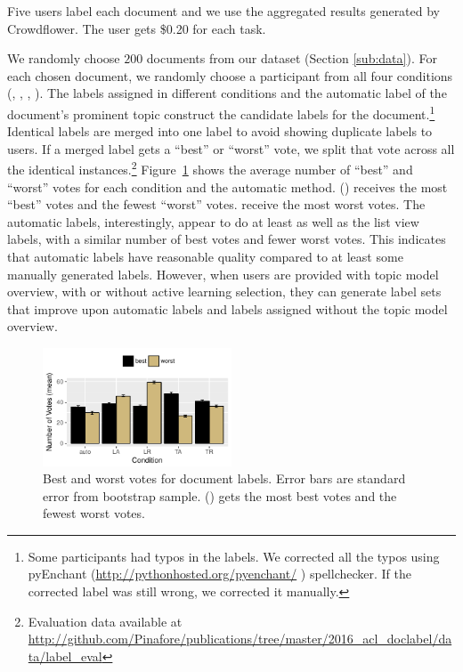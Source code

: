Five users label each document and we use the aggregated results generated by
Crowdflower. The user gets \$0.20 for each task. 

We randomly choose $200$ documents from our dataset (Section
\ref{sub:data}). For each chosen document, we randomly choose a participant from
all four conditions (, , , ). The labels
assigned in different conditions and the automatic label of the document's prominent
topic construct the candidate labels for the document.\footnote{Some
  participants had typos in the labels. We corrected all the typos using
  pyEnchant (\let\hyper@linkurl\saved@hyper@linkurl \url{http://pythonhosted.org/pyenchant/} \NoHyper) spellchecker. If the
  corrected label was still wrong, we corrected it manually.} Identical labels are
merged into one label to avoid showing duplicate labels to users. If a merged
label gets a ``best'' or ``worst'' vote, we split that vote across all the
identical instances.\footnote{
Evaluation data available at \let\hyper@linkurl\saved@hyper@linkurl\url{http://github.com/Pinafore/publications/tree/master/2016_acl_doclabel/data/label_eval} \NoHyper
}
Figure~\ref{fig:eval_votes} shows the average number of ``best'' and ``worst''
votes for each condition and the automatic method.
\name{} () receives the most ``best'' votes and the fewest
``worst'' votes.  receive the most worst votes. The automatic labels, interestingly, appear to do at least as well as the list view labels, with a similar number of best votes and fewer worst votes.  This indicates that automatic labels have reasonable quality compared to at least some manually generated labels. However, when users are provided with topic model overview, with or
without active learning selection, they can generate label sets that
 improve upon automatic labels and labels assigned without the topic
model overview.













\begin{figure}[t!]
 \includegraphics[width=0.5\textwidth]{2016_acl_doclabel/auto_fig/eval_votes}
 \caption{Best and worst votes for document labels. Error
   bars are standard error from bootstrap sample. \name{}
   () gets the most best votes and the fewest worst votes.}
\label{fig:eval_votes}
\end{figure}